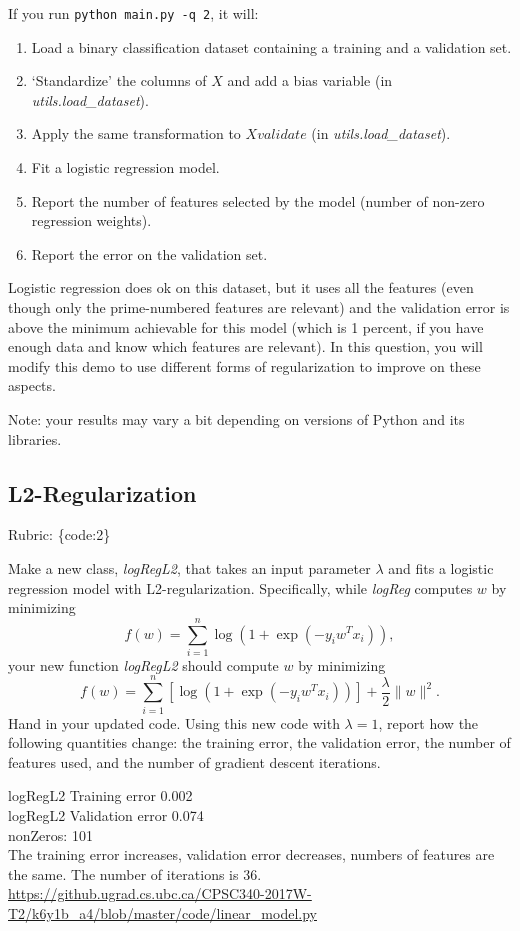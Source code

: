 \documentclass{article}
\def\rubric#1{\gre{Rubric: \{#1\}}}{}
\def\blu#1{{\color{blu}#1}}
\def\gre#1{{\color{gre}#1}}
\def\norm#1{\|#1\|}
\def\enum#1{\begin{enumerate}#1\end{enumerate}}
\begin{document}
If you run  \verb|python main.py -q 2|, it will:
\enum{
\item Load a binary classification dataset containing a training and a validation set.
\item `Standardize' the columns of $X$ and add a bias variable (in \emph{utils.load\_dataset}).
\item Apply the same transformation to $Xvalidate$ (in \emph{utils.load\_dataset}).
\item Fit a logistic regression model.
\item Report the number of features selected by the model (number of non-zero regression weights).
\item Report the error on the validation set.
}
Logistic regression does ok on this dataset,
but it uses all the features (even though only the prime-numbered features are relevant)
and the validation error is above the minimum achievable for this model
(which is 1 percent, if you have enough data and know which features are relevant).
In this question, you will modify this demo to use different forms of regularization
 to improve on these aspects.

Note: your results may vary a bit depending on versions of Python and its libraries.


\subsection{L2-Regularization}
\rubric{code:2}

Make a new class, \emph{logRegL2}, that takes an input parameter $\lambda$ and fits a logistic regression model with L2-regularization. Specifically, while \emph{logReg} computes $w$ by minimizing
\[
f(w) = \sum_{i=1}^n \log(1+\exp(-y_iw^Tx_i)),
\]
your new function \emph{logRegL2} should compute $w$ by minimizing
\[
f(w) = \sum_{i=1}^n \left[\log(1+\exp(-y_iw^Tx_i))\right] + \frac{\lambda}{2}\norm{w}^2.
\]
\blu{Hand in your updated code. Using this new code with $\lambda = 1$, report how the following quantities change: the training error, the validation error, the number of features used, and the number of gradient descent iterations.}

\blu{logRegL2 Training error 0.002\\
logRegL2 Validation error 0.074\\
 nonZeros: 101\\
The training error increases, validation error decreases, numbers of features are the same.
The number of iterations is 36.\\
\url{https://github.ugrad.cs.ubc.ca/CPSC340-2017W-T2/k6y1b_a4/blob/master/code/linear_model.py}
}
\end{document}
